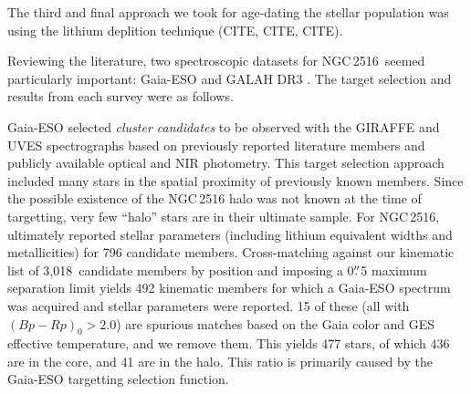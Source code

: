 \documentclass[12pt,twocolumn,tighten]{aastex63}
\newcommand{\cn}{NGC\,2516} %
\newcommand{\nkinematic}{3{,}018\ } %
\begin{document}
The third and final approach we took for age-dating the stellar
population was using the lithium deplition technique (CITE, CITE,
CITE).

Reviewing the literature, two spectroscopic datasets for \cn\ seemed
particularly important: Gaia-ESO 
\citep{randich_gaiaeso_2018} and GALAH DR3 \citep{buder_galah_2020}.
The target selection and results from each survey were as follows.

Gaia-ESO selected {\it cluster candidates} to be observed with the
GIRAFFE and UVES spectrographs based on previously reported literature
members and publicly available optical and NIR photometry.  This
target selection approach included many stars in the spatial proximity
of previously known members.  Since the possible existence of the \cn
halo was not known at the time of targetting, very few ``halo'' stars
are in their ultimate sample.  For \cn, \citet{randich_gaiaeso_2018}
ultimately reported stellar parameters (including lithium equivalent
widths and metallicities) for 796 candidate members.  Cross-matching
against our kinematic list of \nkinematic candidate members by position and
imposing a 0$\mbox{$.\!\!^{\prime\prime}$}$5 maximum separation limit yields 492 kinematic
members for which a Gaia-ESO spectrum was acquired and stellar
parameters were reported.  15 of these (all with $(Bp-Rp)_0 > 2.0$)
are spurious matches based on the Gaia color and GES effective
temperature, and we remove them.  This yields 477 stars, of which 436
are in the core, and 41 are in the halo.  This ratio is primarily
caused by the Gaia-ESO targetting selection function.

\end{document}
